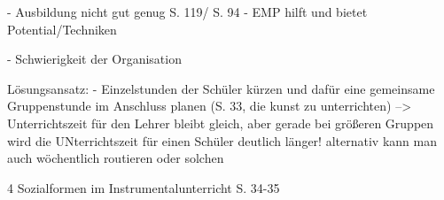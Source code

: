 

- Ausbildung nicht gut genug S. 119/ S. 94
- EMP hilft und bietet Potential/Techniken

- Schwierigkeit der Organisation

Lösungsansatz:
- Einzelstunden der Schüler kürzen und dafür eine gemeinsame Gruppenstunde im
Anschluss planen (S. 33, die kunst zu unterrichten)
--> Unterrichtszeit für den Lehrer bleibt gleich, aber gerade bei größeren
Gruppen wird die UNterrichtszeit für einen Schüler deutlich länger!
    alternativ kann man auch wöchentlich routieren oder solchen


4 Sozialformen im Instrumentalunterricht S. 34-35    
